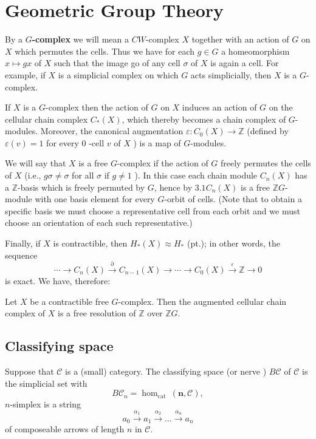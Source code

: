 \chapter{Geometric Group Theory}

By a \textbf{$G$-complex} we will mean a $C W$-complex $X$ together with an action of $G$ on $X$ which permutes the cells. Thus we have for each $g \in G$ a homeomorphism $x \mapsto g x$ of $X$ such that the image go of any cell $\sigma$ of $X$ is again a cell. For example, if $X$ is a simplicial complex on which $G$ acts simplicially, then $X$ is a $G$-complex.

If $X$ is a $G$-complex then the action of $G$ on $X$ induces an action of $G$ on the cellular chain complex $C_*(X)$, which thereby becomes a chain complex of $G$-modules. Moreover, the canonical augmentation $\varepsilon: C_0(X) \rightarrow \mathbb{Z}$ (defined by $\varepsilon(v)=1$ for every 0 -cell $v$ of $X$ ) is a map of $G$-modules.

We will say that $X$ is a free $G$-complex if the action of $G$ freely permutes the cells of $X$ (i.e., $g \sigma \neq \sigma$ for all $\sigma$ if $g \neq 1$ ). In this case each chain module $C_n(X)$ has a $\mathbb{Z}$-basis which is freely permuted by $G$, hence by $3.1 C_n(X)$ is a free $\mathbb{Z} G$-module with one basis element for every $G$-orbit of cells. (Note that to obtain a specific basis we must choose a representative cell from each orbit and we must choose an orientation of each such representative.)

Finally, if $X$ is contractible, then $H_*(X) \approx H_*$ (pt.); in other words, the sequence
$$
\cdots \rightarrow C_n(X) \stackrel{\partial}{\rightarrow} C_{n-1}(X) \rightarrow \cdots \rightarrow C_0(X) \stackrel{\varepsilon}{\rightarrow} \mathbb{Z} \rightarrow 0
$$
is exact. We have, therefore:

\begin{prop}
    
    Let $X$ be a contractible free $G$-complex. Then the augmented cellular chain complex of $X$ is a free resolution of $\mathbb{Z}$ over $\mathbb{Z} G$.
\end{prop}




\section{Classifying space}

Suppose that $\mathcal{C}$ is a (small) category. The classifying space (or nerve ) $B \mathcal{C}$ of $\mathcal{C}$ is the simplicial set with
$$
B \mathcal{C}_n=\operatorname{hom}_{\text {cat }}(\mathbf{n}, \mathcal{C}),
$$
$n$-simplex is a string
$$
a_0 \xrightarrow{\alpha_1} a_1 \xrightarrow{\alpha_2} \ldots \xrightarrow{\alpha_n} a_n
$$
of composeable arrows of length $n$ in $\mathcal{C}$.\\

